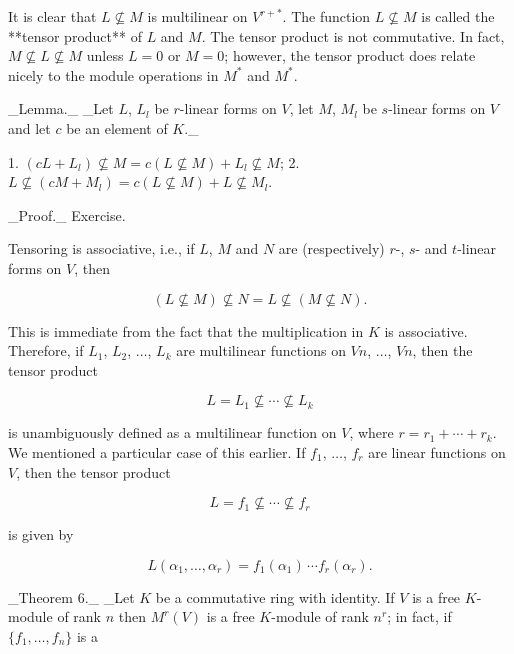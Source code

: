 It is clear that \(L\not\subseteq M\) is multilinear on \(V^{r+*}\). The function \(L\not\subseteq M\) is called the **tensor product** of \(L\) and \(M\). The tensor product is not commutative. In fact, \(M\not\subseteq L\not\subseteq M\) unless \(L=0\) or \(M=0\); however, the tensor product does relate nicely to the module operations in \(M^{*}\) and \(M^{*}\).

_Lemma._ _Let \(L\), \(L_{l}\) be \(r\)-linear forms on \(V\), let \(M\), \(M_{l}\) be \(s\)-linear forms on \(V\) and let \(c\) be an element of \(K\)._

1. \((cL+L_{l})\not\subseteq M=c(L\not\subseteq M)+L_{l}\not\subseteq M\);
2. \(L\not\subseteq(cM+M_{l})=c(L\not\subseteq M)+L\not\subseteq M_{l}\).

_Proof._ Exercise.

Tensoring is associative, i.e., if \(L\), \(M\) and \(N\) are (respectively) \(r\)-, \(s\)- and \(t\)-linear forms on \(V\), then

\[(L\not\subseteq M)\not\subseteq N=L\not\subseteq(M\not\subseteq N).\]

This is immediate from the fact that the multiplication in \(K\) is associative. Therefore, if \(L_{1}\), \(L_{2}\), \(\ldots\), \(L_{k}\) are multilinear functions on \(Vn\), \(\ldots\), \(Vn\), then the tensor product

\[L=L_{1}\not\subseteq\cdots\not\subseteq L_{k}\]

is unambiguously defined as a multilinear function on \(V\), where \(r=r_{1}+\cdots+r_{k}\). We mentioned a particular case of this earlier. If \(f_{1}\), \(\ldots\), \(f_{r}\) are linear functions on \(V\), then the tensor product

\[L=f_{1}\not\subseteq\cdots\not\subseteq f_{r}\]

is given by

\[L(\alpha_{1},\ldots,\alpha_{r})=f_{1}(\alpha_{1})\,\cdots f_{r}(\alpha_{r}).\]

_Theorem 6._ _Let \(K\) be a commutative ring with identity. If \(V\) is a free \(K\)-module of rank \(n\) then \(M^{r}(V)\) is a free \(K\)-module of rank \(n^{r}\); in fact, if \(\{f_{1},\ldots,f_{n}\}\) is a 